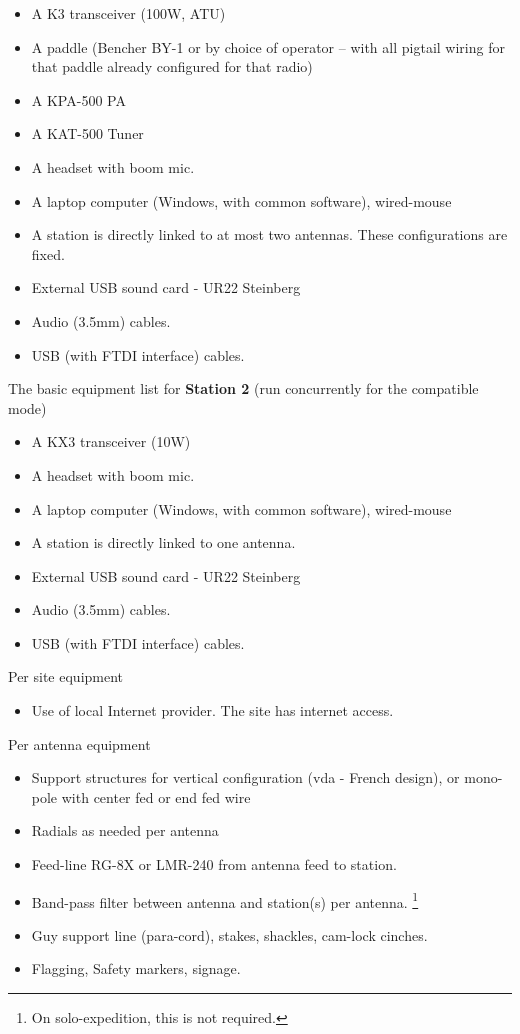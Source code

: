 \documentclass[11pt]{article}
\begin{document}
\begin{itemize}
\item A K3 transceiver (100W, ATU)
\item A paddle (Bencher BY-1 or by choice of operator -- with
all pigtail wiring for that paddle already configured for that radio)
\item A KPA-500 PA
\item A KAT-500 Tuner
\item A headset with boom mic.
\item A laptop computer (Windows, with common software), wired-mouse
\item A station is directly linked to at most two antennas. These
configurations are fixed.
\item External USB sound card - UR22 Steinberg
\item Audio (3.5mm) cables. 
\item USB (with FTDI interface) cables.
\end{itemize}

The basic equipment list for {\textbf{Station 2}} (run concurrently
for the compatible mode)
\begin{itemize}
\item A KX3 transceiver (10W)
\item A headset with boom mic.
\item A laptop computer (Windows, with common software), wired-mouse
\item A station is directly linked to one antenna.
\item External USB sound card - UR22 Steinberg
\item Audio (3.5mm) cables. 
\item USB (with FTDI interface) cables.
\end{itemize}

Per site equipment
\begin{itemize}
\item Use of local Internet provider.  The site has internet access.
\end{itemize}

Per antenna equipment
\begin{itemize}
\item Support structures for vertical configuration ({\gls{vda}} - French 
design), or mono-pole with center fed or end fed wire
\item Radials as needed per antenna
\item Feed-line RG-8X or LMR-240 from antenna feed to station.
\item Band-pass filter between antenna and station(s) per antenna.
\footnote{On solo-expedition, this is not required.}
\item Guy support line (para-cord), stakes, shackles, cam-lock cinches.
\item Flagging, Safety markers, signage.
\end{itemize}
\end{document}
